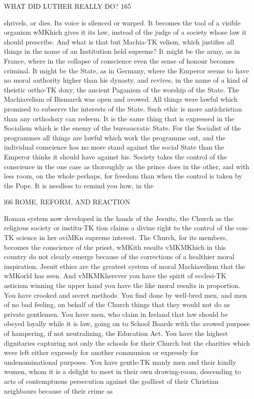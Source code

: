 \documentclass[12pt,a5paper,twoside]{book}
\begin{document}
{WHAT DID LUTHER REALLY DO? 165 

shrivels, or dies. Its voice is silenced or warped. 
It becomes the tool of a visible organism wMKhich gives 
it its law, instead of the judge of a society whose law 
it should prescribe. And what is that but Machia-TK
velism, which justifies all things in the name of an 
Institution held supreme? It might be the army, as 
in France, where in the collapse of conscience even 
the sense of honour becomes criminal. It might be 
the State, as in Germany, where the Emperor seems 
to have no moral authority higher than his dynasty, 
and revives, in the name of a kind of theistic ortho-TK
doxy, the ancient Paganism of the worship of 
the State. The Machiavelism of Bismarck was open 
and avowed. All things were lawful which promised 
to subserve the interests of the State. Such ethic is 
more antichristian than any orthodoxy can redeem. 
It is the same thing that is expressed in the Socialism 
which is the enemy of the bureaucratic State. For 
the Socialist of the programmes all things are lawful 
which work the programme out, and the individual 
conscience has no more stand against the social State 
than the Emperor thinks it should have against his. 
Society takes the control of the conscience in the 
one case as thoroughly as the prince does in the 
other, and with less room, on the whole perhaps, 
for freedom than when the control is taken by the 
Pope. It is needless to remind you how, in the 



l66 ROME, REFORM, AND REACTION 

Roman system now developed in the hands of the 
Jesuits, the Church as the religious society or institu-TK
tion claims a divine right to the control of the con-TK
science in her oviMKn supreme interest. The Church, 
for its members, becomes the conscience of the priest, 
wMKith results vMKMKhich in this country do not clearly 
emerge because of the corrections of a healthier 
moral inspiration. Jesuit ethics are the greatest 
system of moral Machiavelism that the wMKorld has 
seen. And vMKMKherever you have the spirit of ecclesi-TK
asticism winning the upper hand you have the like 
moral results in proportion. You have crooked and 
secret methods. You find done by well-bred men, 
and men of no bad feeling, on behalf of the Church 
things that they would not do as private gentlemen. 
You have men, who claim in Ireland that law should 
be obeyed loyally while it is law, going on to School 
Boards with the avowed purpose of hampering, if not 
neutralizing, the Education Act. You have the 
highest dignitaries capturing not only the schools 
for their Church but the charities which were left 
either expressly for another communion or expressly 
for undenominational purposes. You have gentle-TK
manly men and their kindly women, whom it is a 
delight to meet in their own drawing-room, descending 
to acts of contemptuous persecution against the godliest 
of their Christian neighbours because of their crime as 



}
\end{document}

